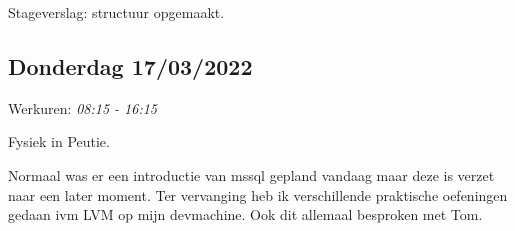Stageverslag: structuur opgemaakt.

\hypertarget{donderdag-17032022}{%
\subsection{Donderdag 17/03/2022}\label{donderdag-17032022}}

Werkuren: \emph{08:15 - 16:15}

Fysiek in Peutie.

Normaal was er een introductie van mssql gepland vandaag maar deze is
verzet naar een later moment. Ter vervanging heb ik verschillende
praktische oefeningen gedaan ivm LVM op mijn devmachine. Ook dit
allemaal besproken met Tom.


